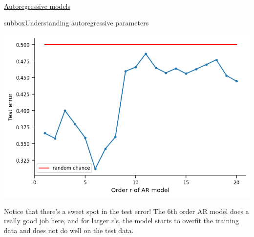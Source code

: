 \begin{textbox}{\href{https://compneuro.neuromatch.io/tutorials/W2D2_LinearSystems/student/W2D2_Tutorial4.html}{Autoregressive models } }
\begin{subbox}{subbox}{Understanding autoregressive parameters}
\begin{center}
\includegraphics[scale=0.35]{Figures/LS/CDS_Figure13.png}
\end{center}


Notice that there's a sweet spot in the test error! The 6th order AR model does a really good job here, and for larger $r$'s, the model starts to overfit the training data and does not do well on the test data.

\end{subbox}
\end{textbox}